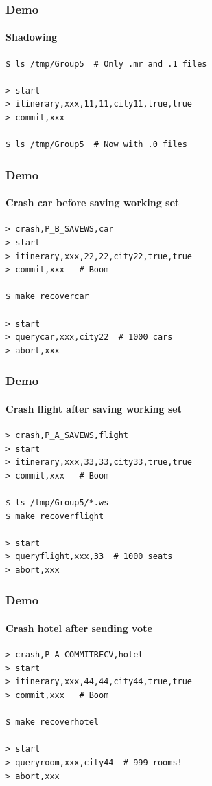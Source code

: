 \documentclass{beamer}
\begin{document}
\begin{frame}[fragile,t]
  \frametitle{Demo}
  \framesubtitle{Shadowing}

\begin{verbatim}
$ ls /tmp/Group5  # Only .mr and .1 files

> start
> itinerary,xxx,11,11,city11,true,true
> commit,xxx

$ ls /tmp/Group5  # Now with .0 files
\end{verbatim}
\end{frame}



\begin{frame}[fragile,t]
  \frametitle{Demo}
  \framesubtitle{Crash car before saving working set}

\begin{verbatim}
> crash,P_B_SAVEWS,car
> start
> itinerary,xxx,22,22,city22,true,true
> commit,xxx   # Boom

$ make recovercar

> start
> querycar,xxx,city22  # 1000 cars
> abort,xxx

\end{verbatim}
\end{frame}


\begin{frame}[fragile,t]
  \frametitle{Demo}
  \framesubtitle{Crash flight after saving working set}

\begin{verbatim}
> crash,P_A_SAVEWS,flight
> start
> itinerary,xxx,33,33,city33,true,true
> commit,xxx   # Boom

$ ls /tmp/Group5/*.ws
$ make recoverflight

> start
> queryflight,xxx,33  # 1000 seats
> abort,xxx
\end{verbatim}
\end{frame}


\begin{frame}[fragile,t]
  \frametitle{Demo}
  \framesubtitle{Crash hotel after sending vote}

\begin{verbatim}
> crash,P_A_COMMITRECV,hotel
> start
> itinerary,xxx,44,44,city44,true,true
> commit,xxx   # Boom

$ make recoverhotel

> start
> queryroom,xxx,city44  # 999 rooms!
> abort,xxx
\end{verbatim}
\end{frame}
\end{document}
